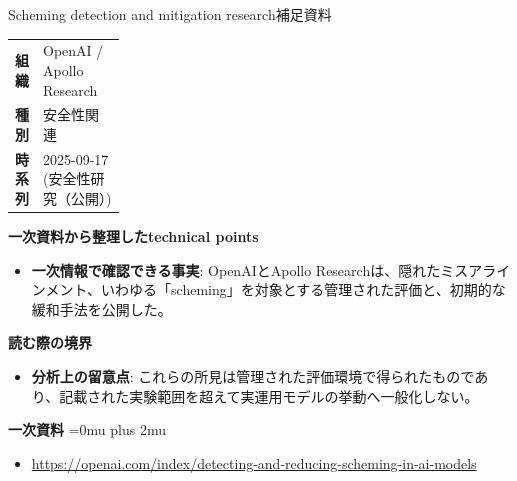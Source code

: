 \begin{technicalnote}{Scheming detection and mitigation research}{補足資料}
\begingroup
\begin{tabularx}{\linewidth}{@{}>{\bfseries}p{0.22\linewidth}X@{}}
組織 & OpenAI / Apollo Research \\
種別 & 安全性関連 \\
時系列 & 2025-09-17 (安全性研究（公開）) \\
\end{tabularx}
\smallskip
{\bfseries 一次資料から整理したtechnical points}
\begin{itemize}[leftmargin=1.5em,itemsep=0.35em]
\item \textbf{一次情報で確認できる事実}: OpenAIとApollo Researchは、隠れたミスアラインメント、いわゆる「scheming」を対象とする管理された評価と、初期的な緩和手法を公開した。
\end{itemize}
\begin{minipage}{\linewidth}
{\bfseries 読む際の境界}
\begin{itemize}[leftmargin=1.5em,itemsep=0.35em]
\item \textbf{分析上の留意点}: これらの所見は管理された評価環境で得られたものであり、記載された実験範囲を超えて実運用モデルの挙動へ一般化しない。
\end{itemize}
\begin{samepage}
{\bfseries 一次資料}
\begingroup\sloppy
\Urlmuskip=0mu plus 2mu\relax
\begin{itemize}[leftmargin=1.5em,itemsep=0.25em]
\item {\scriptsize\url{https://openai.com/index/detecting-and-reducing-scheming-in-ai-models}}
\end{itemize}
\endgroup
\end{samepage}
\end{minipage}
\endgroup
\end{technicalnote}
\medskip
